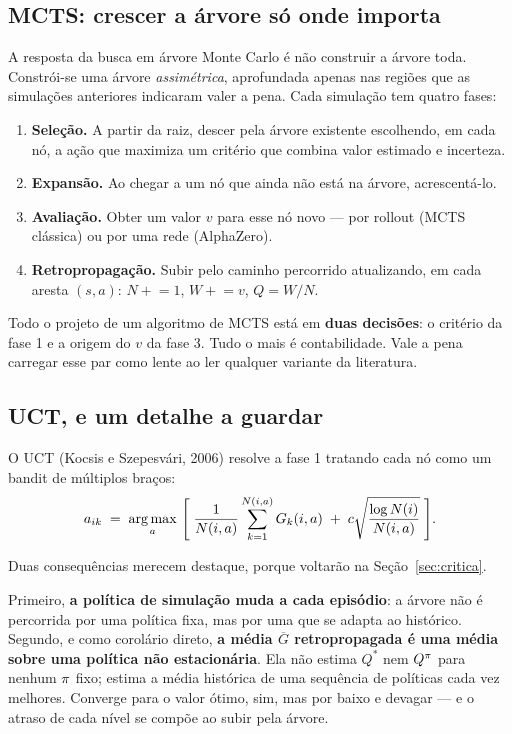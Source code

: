 \documentclass[11pt]{article}
\newcommand{\Nvis}{N}
\newcommand{\Wtot}{W}
\begin{document}
\subsection{MCTS: crescer a árvore só onde importa}

A resposta da busca em árvore Monte Carlo é não construir a árvore toda. Constrói-se
uma árvore \emph{assimétrica}, aprofundada apenas nas regiões que as simulações
anteriores indicaram valer a pena. Cada simulação tem quatro fases:

\begin{enumerate}
  \item \textbf{Seleção.} A partir da raiz, descer pela árvore existente
        escolhendo, em cada nó, a ação que maximiza um critério que combina valor
        estimado e incerteza.
  \item \textbf{Expansão.} Ao chegar a um nó que ainda não está na árvore,
        acrescentá-lo.
  \item \textbf{Avaliação.} Obter um valor $v$ para esse nó novo — por rollout
        (MCTS clássica) ou por uma rede (AlphaZero).
  \item \textbf{Retropropagação.} Subir pelo caminho percorrido atualizando, em
        cada aresta $(s,a)$: $\Nvis \mathrel{+}= 1$, $\Wtot \mathrel{+}= v$,
        $Q = \Wtot/\Nvis$.
\end{enumerate}

\begin{ideiabox}
Todo o projeto de um algoritmo de MCTS está em \textbf{duas decisões}: o critério
da fase 1 e a origem do $v$ da fase 3. Tudo o mais é contabilidade. Vale a pena
carregar esse par como lente ao ler qualquer variante da literatura.
\end{ideiabox}

\subsection{UCT, e um detalhe a guardar}

O UCT (Kocsis e Szepesvári, 2006) resolve a fase 1 tratando cada nó como um
bandit de múltiplos braços:
\[
  a_{ik} \;=\; \argmax_{a}\ \Biggl[\;
  \frac{1}{\Nvis(i,a)}\sum_{k=1}^{\Nvis(i,a)} G_k(i,a)
  \;+\; c\sqrt{\frac{\log \Nvis(i)}{\Nvis(i,a)}}\;\Biggr].
\]

Duas consequências merecem destaque, porque voltarão na Seção~\ref{sec:critica}.

Primeiro, \textbf{a política de simulação muda a cada episódio}: a árvore não é
percorrida por uma política fixa, mas por uma que se adapta ao histórico. Segundo,
e como corolário direto, \textbf{a média $\overline{G}$ retropropagada é uma média
sobre uma política não estacionária}. Ela não estima $Q^{*}$ nem $Q^{\pi}$ para
nenhum $\pi$ fixo; estima a média histórica de uma sequência de políticas cada
vez melhores. Converge para o valor ótimo, sim, mas por baixo e devagar — e o
atraso de cada nível se compõe ao subir pela árvore.
\end{document}
